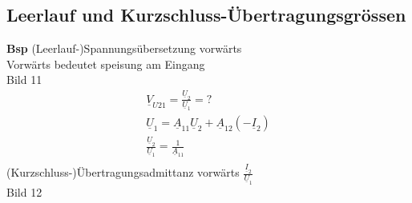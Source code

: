 \subsection{Leerlauf und Kurzschluss-Übertragungsgrössen}
\textbf{Bsp} (Leerlauf-)Spannungsübersetzung vorwärts\\
Vorwärts bedeutet speisung am Eingang\\
Bild 11\\
\begin{align}
	\underline{V}_{U21}=\frac{\underline{U}_2}{\underline{U}_1}=?\nonumber\\
	\underline{U}_1=\underline{A}_{11}\underline{U}_{2}+\underline{A}_{12}\left(-\underline{I}_2\right)\nonumber\\
	\frac{\underline{U}_2}{\underline{U}_1}=\frac{1}{\underline{A}_11}\nonumber\\
\end{align}
(Kurzschluss-)Übertragungsadmittanz vorwärts
$\frac{\underline{I}_2}{\underline{U}_1}$\\
Bild 12\\
\begin{align}
	
\end{align}